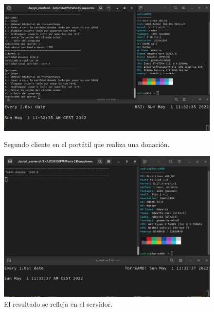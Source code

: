 \documentclass{article}
\begin{document}
\begin{figure}[H]
    \centering
    \begin{minipage}[H]{0.49\textwidth}
        \centering
        \includegraphics[width=\textwidth]{imagenes/multiples ordenadores/Cliente/Screenshot from 2022-05-01 11-32-38.png}
        \caption{Segundo cliente en el portátil que realiza una donación.}
    \end{minipage}
    \hfill
    \begin{minipage}[H]{0.49\textwidth}
        \centering
        \includegraphics[width=\textwidth]{imagenes/multiples ordenadores/Servidor/Screenshot from 2022-05-01 11-32-38.png}
        \caption{El resultado se refleja en el servidor.}
    \end{minipage}
\end{figure}
\end{document}

